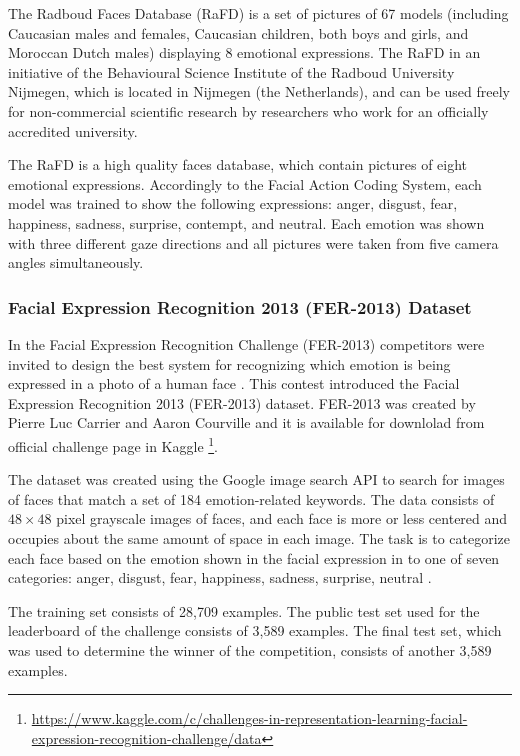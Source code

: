 {\color{Orchid} The Radboud Faces Database (RaFD) is a set of pictures
of 67 models (including Caucasian males and females, Caucasian children,
both boys and girls, and Moroccan Dutch males) displaying 8 emotional
expressions. The RaFD in an initiative of the Behavioural Science
Institute of the Radboud University Nijmegen, which is located in
Nijmegen (the Netherlands), and can be used freely for non-commercial
scientific research by researchers who work for an officially accredited
university.

The RaFD is a high quality faces database, which contain pictures of
eight emotional expressions. Accordingly to the Facial Action Coding
System, each model was trained to show the following expressions:
anger, disgust, fear, happiness, sadness, surprise, contempt, and
neutral. Each emotion was shown with three different gaze directions
and all pictures were taken from five camera angles simultaneously.}
\citep{Langner2010}


\subsubsection{Facial Expression Recognition 2013 (FER-2013) Dataset}

In the Facial Expression Recognition Challenge (FER-2013) competitors
were invited to design the best system for recognizing which emotion
is being expressed in a photo of a human face \citep{Goodfellow2013}.
This contest introduced the Facial Expression Recognition 2013
(FER-2013) dataset. FER-2013 was created by Pierre Luc Carrier
and Aaron Courville and it is available for downlolad from official
challenge page in Kaggle
\footnote{\url{https://www.kaggle.com/c/challenges-in-representation-learning-facial-expression-recognition-challenge/data}}.

The dataset was created using the Google image search API to search for
images of faces that match a set of 184 emotion-related keywords. The data
consists of $48\times 48$ pixel grayscale images of faces, and each face
is more or less centered and occupies about the same amount of space in
each image. The task is to categorize each face based on the emotion
shown in the facial expression in to one of seven categories: anger,
disgust, fear, happiness, sadness, surprise, neutral \citep{Goodfellow2013}.

The training set consists of 28,709 examples. The public test set used
for the leaderboard of the challenge consists of 3,589 examples. The
final test set, which was used to determine the winner of the competition,
consists of another 3,589 examples.


